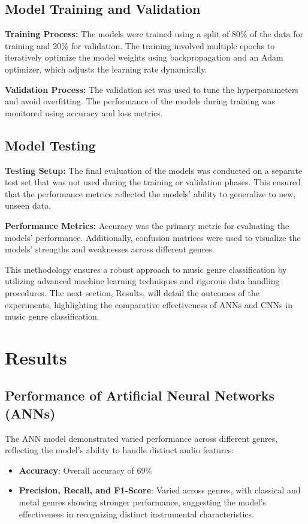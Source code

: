 \documentclass[lettersize,journal]{IEEEtran}
\begin{document}
\subsection{Model Training and Validation}
\textbf{Training Process:} The models were trained using a split of 80\% of the data for training and 20\% for validation. The training involved multiple epochs to iteratively optimize the model weights using backpropagation and an Adam optimizer, which adjusts the learning rate dynamically.

\textbf{Validation Process:} The validation set was used to tune the hyperparameters and avoid overfitting. The performance of the models during training was monitored using accuracy and loss metrics.

\subsection{Model Testing}
\textbf{Testing Setup:} The final evaluation of the models was conducted on a separate test set that was not used during the training or validation phases. This ensured that the performance metrics reflected the models' ability to generalize to new, unseen data.

\textbf{Performance Metrics:} Accuracy was the primary metric for evaluating the models' performance. Additionally, confusion matrices were used to visualize the models' strengths and weaknesses across different genres.

This methodology ensures a robust approach to music genre classification by utilizing advanced machine learning techniques and rigorous data handling procedures. The next section, Results, will detail the outcomes of the experiments, highlighting the comparative effectiveness of ANNs and CNNs in music genre classification.
\section{Results}

\subsection{Performance of Artificial Neural Networks (ANNs)}

The ANN model demonstrated varied performance across different genres, reflecting the model's ability to handle distinct audio features:
\begin{itemize}
    \item \textbf{Accuracy}: Overall accuracy of 69\%
    \item \textbf{Precision, Recall, and F1-Score}: Varied across genres, with classical and metal genres showing stronger performance, suggesting the model's effectiveness in recognizing distinct instrumental characteristics.
\end{itemize}
\end{document}
